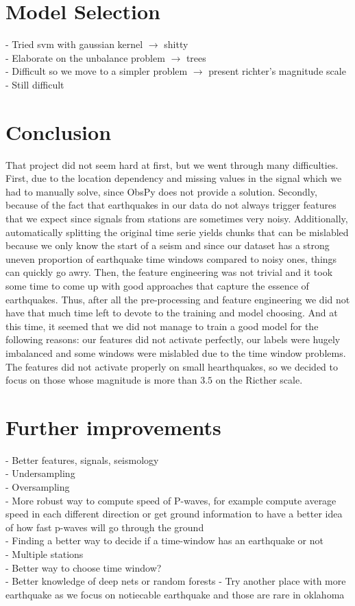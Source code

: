 \documentclass[10pt,conference,compsocconf]{IEEEtran}
\begin{document}
\section{Model Selection}
- Tried svm with gaussian kernel $\rightarrow$ shitty\\
- Elaborate on the unbalance problem $\rightarrow$ trees\\
- Difficult so we move to a simpler problem $\rightarrow$ present richter's magnitude scale\\
- Still difficult\\

\section{Conclusion}
That project did not seem hard at first, but we went through many difficulties. First, due to the location dependency and missing values in the signal which we had to manually solve, since ObsPy does not provide a solution. Secondly, because of the fact that earthquakes in our data do not always trigger features that we expect since signals from stations are sometimes very noisy. Additionally, automatically splitting the original time serie yields chunks that can be mislabled because we only know the start of a seism and since our dataset has a strong uneven proportion of earthquake time windows compared to noisy ones, things can quickly go awry. Then, the feature engineering was not trivial and it took some time to come up with good approaches that capture the essence of earthquakes.\newline
Thus, after all the pre-processing and feature engineering we did not have that much time left to devote to the training and model choosing. And at this time, it seemed that we did not manage to train a good model for the following reasons: our features did not activate perfectly, our labels were hugely imbalanced and some windows were mislabled due to the time window problems. The features did not activate properly on small hearthquakes, so we decided to focus on those whose magnitude is more than $3.5$ on the Ricther scale.\newline


\section{Further improvements}
- Better features, signals, seismology\\
- Undersampling\\
- Oversampling\\
- More robust way to compute speed of P-waves, for example compute average speed in each different direction or get ground information to have a better idea of how fast p-waves will go through the ground\\
- Finding a better way to decide if a time-window has an earthquake or not\\
- Multiple stations\\
- Better way to choose time window?\\
- Better knowledge of deep nets or random forests
- Try another place with more earthquake as we focus on notiecable earthquake and those are rare in oklahoma
\end{document}
